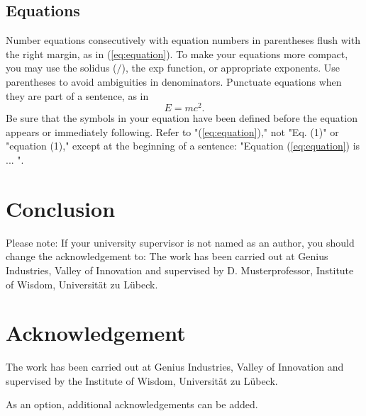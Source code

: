 \documentclass[10pt,a4paper,oneside,twocolumn]{article}
\begin{document}
\subsection{Equations}
Number equations consecutively with equation numbers in parentheses flush with the right margin, as in (\ref{eq:equation}).
To make your equations more compact, you may use the solidus ($/$), the exp function, or appropriate exponents. Use parentheses to avoid ambiguities in denominators. Punctuate equations when they are part of a sentence, as in 
\begin{equation}
\label{eq:equation}
E = mc^{2}.
\end{equation}
Be sure that the symbols in your equation have been defined before the equation appears or immediately following. Refer to "(\ref{eq:equation})," not "Eq. (1)" or "equation (1)," except at the beginning of a sentence: "Equation (\ref{eq:equation}) is ... ".


\section{Conclusion}
Please note: If your university supervisor is not named as an author, you should change the acknowledgement to: The work has been carried out at Genius Industries, Valley of Innovation and supervised by D. Musterprofessor, Institute of Wisdom, Universität zu Lübeck.


\section*{Acknowledgement}
The work has been carried out at Genius Industries, Valley of Innovation and supervised by the Institute of Wisdom, Universität zu Lübeck.

As an option, additional acknowledgements can be added.



\end{document}
